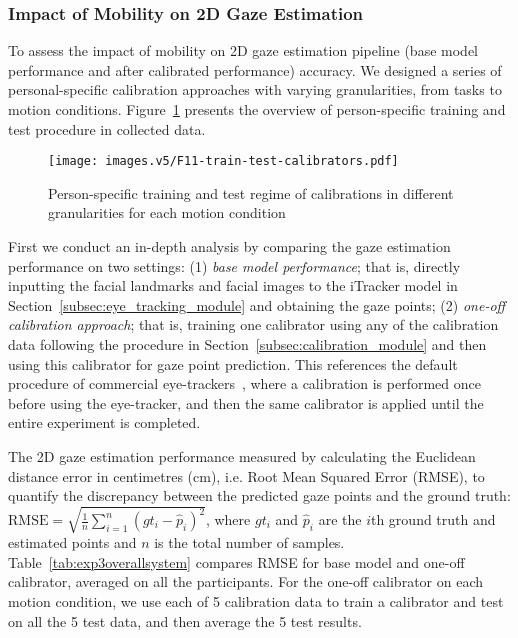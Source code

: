 \subsubsection{Impact of Mobility on 2D Gaze Estimation}
To assess the impact of mobility on 2D gaze estimation pipeline (base model performance and after calibrated performance) accuracy. We designed a series of personal-specific calibration approaches with varying granularities, from tasks to motion conditions. Figure~\ref{fig:train-test-calibrators} presents the overview of person-specific training and test procedure in collected data. 


\begin{figure}[!htbp]
    \centering
    \texttt{[image: images.v5/F11-train-test-calibrators.pdf]}
    \caption{Person-specific training and test regime of calibrations in different granularities for each motion condition}
    \label{fig:train-test-calibrators}
\end{figure}

First we conduct an in-depth analysis by comparing the gaze estimation performance on two settings: (1) \textit{base model performance}; that is, directly inputting the facial landmarks and facial images to the iTracker model in Section~\ref{subsec:eye_tracking_module} and obtaining the gaze points; (2) \textit{one-off calibration approach}; that is, training one calibrator using any of the calibration data following the procedure in Section~\ref{subsec:calibration_module} and then using this calibrator for gaze point prediction. This references the default procedure of commercial eye-trackers~\cite{Tobii2023eyetrackerusage, Gazepoint2022tutorial}, where a calibration is performed once before using the eye-tracker, and then the same calibrator is applied until the entire experiment is completed.


The 2D gaze estimation performance measured by calculating the Euclidean distance error in centimetres (cm), i.e. Root Mean Squared Error (RMSE), to quantify the discrepancy between the predicted gaze points and the ground truth: $\text{RMSE} = \sqrt{\frac{1}{n} \sum_{i=1}^n (gt_i - \hat{p}_i)^2}$, where $gt_i$ and $\hat{p}_i$ are the $i$th ground truth and estimated points and $n$ is the total number of samples. Table~\ref{tab:exp3overallsystem} compares RMSE for base model and one-off calibrator, averaged on all the participants. For the one-off calibrator on each motion condition, we use each of 5 calibration data to train a calibrator and test on all the 5 test data, and then average the 5 test results. 


